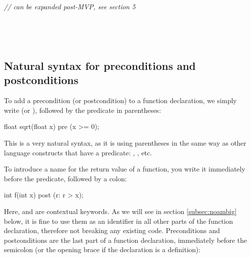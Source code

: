 \begin{adjustwidth}{0.5cm}{0.5cm}
 \\
\phantom{~~~}

 \\
\phantom{~~~}

 \\
\phantom{~~~} \phantom{~~~}\emph{// can be expanded post-MVP, see section 5}

 \\
\phantom{~~~}

 \\
\phantom{~~~}

\end{adjustwidth}

\subsection{Natural syntax for preconditions and postconditions}

To add a precondition (or postcondition) to a function declaration, we simply write  (or ), followed by the predicate in parentheses:

\vspace{2mm}
\begin{codeblock}
float sqrt(float x)
  pre (x >= 0);
\end{codeblock}
\vspace{2mm}

This is a very natural syntax, as it is using parentheses in the same way as other language constructs that have a predicate: , , etc.

To introduce a name for the return value of a function, you write it immediately before the predicate, followed by a colon:

\vspace{2mm}
\begin{codeblock}
int f(int x)
  post (r: r > x);
\end{codeblock}
\vspace{2mm}

Here,  and  are contextual keywords. As we will see in section \ref{subsec:noambig} below, it is fine to use them as an identifier in all other parts of the function declaration, therefore not breaking any existing code. Preconditions and postconditions are the last part of a function declaration, immediately before the semicolon (or the opening brace if the declaration is a definition):

